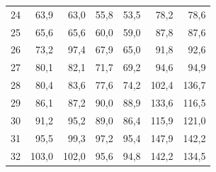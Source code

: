 \begin{table}[H]
\begin{tabular}{rrrrrrr}
24 & 63,9 & 63,0 & 55,8 & 53,5 & 78,2 & 78,6 \\
25 & 65,6 & 65,6 & 60,0 & 59,0 & 87,8 & 87,6 \\
26 & 73,2 & 97,4 & 67,9 & 65,0 & 91,8 & 92,6 \\
27 & 80,1 & 82,1 & 71,7 & 69,2 & 94,6 & 94,9 \\
28 & 80,4 & 83,6 & 77,6 & 74,2 & 102,4 & 136,7 \\
29 & 86,1 & 87,2 & 90,0 & 88,9 & 133,6 & 116,5 \\
30 & 91,2 & 95,2 & 89,0 & 86,4 & 115,9 & 121,0 \\
31 & 95,5 & 99,3 & 97,2 & 95,4 & 147,9 & 142,2 \\
32 & 103,0 & 102,0 & 95,6 & 94,8 & 142,2 & 134,5 \\
\bottomrule
\end{tabular}
\end{table}
